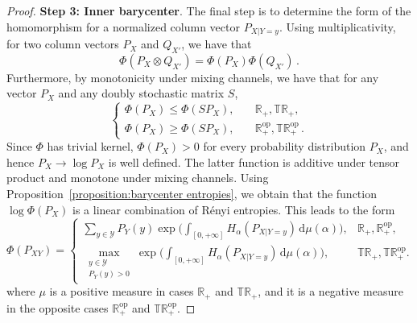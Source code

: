 \documentclass[aps,pra,11pt,onecolumn,nofootinbib,tightenlines]{revtex4-2}
\theoremstyle{definition}
\begin{document}
\begin{proof}
\noindent \textbf{Step 3: Inner barycenter}. The final step is to determine the form of the homomorphism for a normalized column vector $P_{X|Y=y}$. Using multiplicativity, for two column vectors $P_X$ and $Q_{X'}$, we have that
\begin{equation}
    \Phi(P_X \otimes Q_{X'}) = \Phi(P_X) \Phi(Q_{X'}) \,.
\end{equation}
Furthermore, by monotonicity under mixing channels, we have that for any vector $P_X$ and any doubly stochastic matrix $S$,
\begin{equation}
\begin{cases}
 \Phi(P_X)\leq \Phi(SP_X), & \quad \mathbb{R}_+,\mathbb{TR}_+, \\
\Phi(P_X) \geq \Phi(SP_X), & \quad \mathbb{R}_+^{\mathrm{op}},\mathbb{TR}_+^{\mathrm{op}}\,.
\end{cases}
\end{equation}
Since $\Phi$ has trivial kernel, $\Phi(P_X)>0$ for every probability distribution $P_X$, and hence $P_X\to \log{P_X}$ is well defined.
The latter function is additive under tensor product and monotone under mixing channels. Using Proposition~\ref{proposition:barycenter entropies}, we obtain that the function $\log{\Phi(P_X)}$ is a linear combination of Rényi entropies. This leads to the form
\begin{equation}
\label{eq:FinalForm proof}
\Phi(P_{XY}) =
\begin{cases} 
\displaystyle \sum_{y \in \mathcal{Y}} P_Y(y) \exp\Bigg(\int_{[0,+\infty]} H_\alpha(P_{X|Y=y}) \, \mathrm{d}\mu(\alpha) \Bigg), & \mathbb{R}_+,\mathbb{R}_+^{\mathrm{op}}, \\
\displaystyle \max \limits_{\substack{y \in \mathcal{Y} \\ P_Y( y) > 0}} \exp\Bigg(\int_{[0,+\infty]} H_\alpha(P_{X|Y=y}) \, \mathrm{d}\mu(\alpha) \Bigg), & \mathbb{TR}_+,\mathbb{TR}_+^{\mathrm{op}}.
\end{cases}
\end{equation}
where $\mu$ is a positive measure in cases $\mathbb{R}_+$ and $\mathbb{TR}_+$, and it is a negative measure in the opposite cases $\mathbb{R}^{\mathrm{op}}_+$ and $\mathbb{TR}^{\mathrm{op}}_+$. 

\bigskip
\bigskip


\end{proof}
\end{document}
